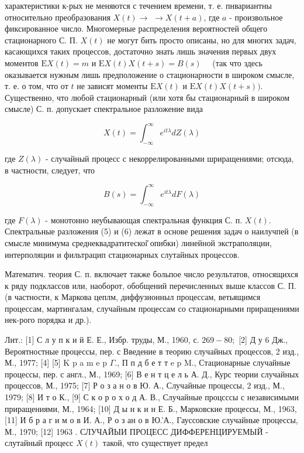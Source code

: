 \documentclass[10pt]{article}
\begin{document}
характеристики к-рых не меняются с течением времени, т. е. пнвариантны относительно преобразования $X(t) \rightarrow$ $\rightarrow X(t+a)$, где $a$ - произвольное фиксированное число. Многомерные распределения вероятностей общего стационарного С. П. $X(t)$ не могут бить просто описаны, но для многих задач, касающихся таких процессов, достаточно знать лишь значения первых двух моментов $\mathrm{E} X(t)=m$ и $\mathrm{E} X(t) X(t+s)=B(s) \quad$ (так что здесь оказывается нужным лишь предположение о стационарности в широком смысле, т. е. о том, что от $t$ не зависят моменты $\mathrm{E} X(t)$ и $\mathrm{E} X(t) X(t+s))$. Существенно, что любой стационарный (или хотя бы стационарный в широком смысле) С. п. допускает спектральное разложение вида



\[

X(t)=\int_{-\infty}^{\infty} e^{i t \lambda} d Z(\lambda)

\]



где $Z(\lambda)$ - случайный процесс с некоррелированными шриращениями; отсюда, в частности, следует, что



\[

B(s)=\int_{-\infty}^{\infty} e^{i t \lambda} d F(\lambda)

\]



где $F(\lambda)$ - монотонно неубывающая спектральная функция С. п. $X(t)$. Спектральные разложения (5) и (6) лежат в основе решения задач о наилучпей (в смысле минимума среднеквадратитескоі̆ опибки) линейной экстраполяции, интерполяции и фильтрацип стационарных слутайных процессов.



Математич. теория С. п. включает также больпое число результатов, относящихся к ряду подклассов или, наоборот, обобщений перечисленных выше классов С. П. (в частности, к Маркова цеплм, диффузионныл процессам, ветьящимся процессам, мартингалам, случайным процессам со стационарными приращениями нек-рого порядка и др.).



Лит.: [1] С л у п к и й Е. Е., Избр. труды, М., 1960, с. $269-80 ;$ [2] Д у 6 Дж., Вероятностные процессы, пер. с Введение в теорию случайных процессов, 2 изд., М., 1977; [4] [5] K p a m e p $\Gamma$., П п д б е т т e p M., Стационарные случайные процессы, пер. с англ., М., 1969; [6] В е н т ц е л ь А. Д., Курс теории случайных процессов, М., 1975; [7] Р о з а н о в Ю. А., Случайные процессы, 2 изд., М., 1979; [8] И т о К., [9] С к о р о х о д А. В., Случайные процсссы с независимыми приращениями, М., 1964; [10] Д ы н к и н Е. Б., Марковские процессы, М., 1963, [11] И б р а г и м о в И. А., Р о з ан о в Ю.'А., Гауссовские случайные процессы, М., 1970; [12] 1963 . СЛУЧАЙЫИ ПРОЦЕСС ДИФФЕРЕНЦИРУЕМЫЙ - слутайный процесс $X(t)$ такой, что существует предел
\end{document}
